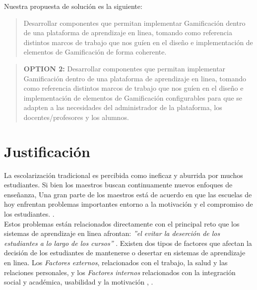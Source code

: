     Nuestra propuesta de solución es la siguiente:
    
    \begin{quote}
    \colorbox{blue!05}{\parbox{\dimexpr\linewidth-2\fboxsep}{\strut
        Desarrollar componentes que permitan implementar Gamificación dentro
        de una plataforma de aprendizaje en linea, tomando como referencia 
        distintos marcos de trabajo que nos guíen en el diseño e implementación
        de elementos de Gamificación de forma coherente.
    \strut}}
    \end{quote}
    
    \begin{quote}
    \colorbox{blue!05}{\parbox{\dimexpr\linewidth-2\fboxsep}{\strut%
    {\bf\color{red} OPTION 2:}%
        Desarrollar componentes que permitan implementar Gamificación dentro
        de una plataforma de aprendizaje en linea, tomando como referencia 
        distintos marcos de trabajo que nos guíen en el diseño e implementación
        de elementos de Gamificación configurables para que se adapten a las 
        necesidades del administrador de la plataforma, los docentes/profesores y 
        los alumnos.
    \strut}}%
    \end{quote}


\section{Justificación}
\label{sec:justificacion}


La escolarización tradicional es percibida como ineficaz y aburrida por muchos estudiantes. Si bien los maestros buscan continuamente nuevos enfoques de enseñanza, Una gran parte de los maestros está de acuerdo en que las escuelas de hoy enfrentan problemas importantes entorno a la motivación y el compromiso de los estudiantes. \cite{objetivo1}.\\

\noindent Estos problemas están relacionados directamente con el principal reto que los sistemas de aprendizaje en linea afrontan: {\it''el evitar la deserción de los estudiantes a lo largo de los cursos''} \cite{objetivo1}. Existen dos tipos de factores que afectan la decisión de los estudiantes de mantenerse o desertar en sistemas de aprendizaje en linea. Los {\it Factores externos}, relacionados con el trabajo, la salud y las relaciones personales, y los {\it Factores internos} relacionados con la integración social y académica, usabilidad y la motivación \cite{DropOut}, \cite{dropoutOnline}.\\
    
